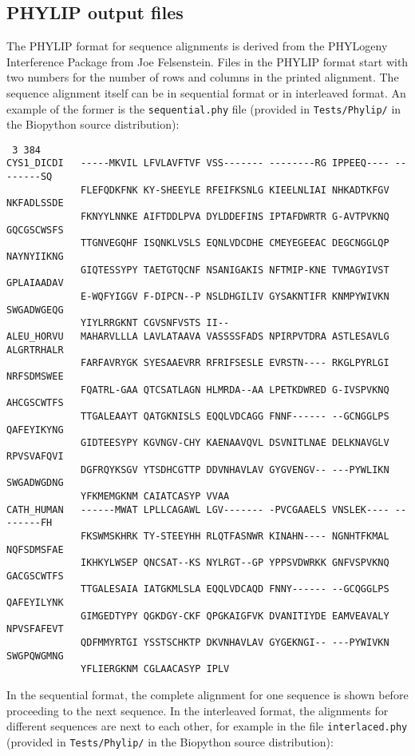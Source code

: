 \subsection{PHYLIP output files}
\label{subsec:align_phylip}

The PHYLIP format for sequence alignments is derived from the PHYLogeny Interference Package from Joe Felsenstein. Files in the PHYLIP format start with two numbers for the number of rows and columns in the printed alignment. The sequence alignment itself can be in sequential format or in interleaved format. An example of the former is the \verb|sequential.phy| file (provided in \verb+Tests/Phylip/+ in the Biopython source distribution):
\begin{verbatim}
 3 384
CYS1_DICDI   -----MKVIL LFVLAVFTVF VSS------- --------RG IPPEEQ---- --------SQ 
             FLEFQDKFNK KY-SHEEYLE RFEIFKSNLG KIEELNLIAI NHKADTKFGV NKFADLSSDE 
             FKNYYLNNKE AIFTDDLPVA DYLDDEFINS IPTAFDWRTR G-AVTPVKNQ GQCGSCWSFS 
             TTGNVEGQHF ISQNKLVSLS EQNLVDCDHE CMEYEGEEAC DEGCNGGLQP NAYNYIIKNG 
             GIQTESSYPY TAETGTQCNF NSANIGAKIS NFTMIP-KNE TVMAGYIVST GPLAIAADAV 
             E-WQFYIGGV F-DIPCN--P NSLDHGILIV GYSAKNTIFR KNMPYWIVKN SWGADWGEQG 
             YIYLRRGKNT CGVSNFVSTS II-- 
ALEU_HORVU   MAHARVLLLA LAVLATAAVA VASSSSFADS NPIRPVTDRA ASTLESAVLG ALGRTRHALR 
             FARFAVRYGK SYESAAEVRR RFRIFSESLE EVRSTN---- RKGLPYRLGI NRFSDMSWEE 
             FQATRL-GAA QTCSATLAGN HLMRDA--AA LPETKDWRED G-IVSPVKNQ AHCGSCWTFS 
             TTGALEAAYT QATGKNISLS EQQLVDCAGG FNNF------ --GCNGGLPS QAFEYIKYNG 
             GIDTEESYPY KGVNGV-CHY KAENAAVQVL DSVNITLNAE DELKNAVGLV RPVSVAFQVI 
             DGFRQYKSGV YTSDHCGTTP DDVNHAVLAV GYGVENGV-- ---PYWLIKN SWGADWGDNG 
             YFKMEMGKNM CAIATCASYP VVAA 
CATH_HUMAN   ------MWAT LPLLCAGAWL LGV------- -PVCGAAELS VNSLEK---- --------FH 
             FKSWMSKHRK TY-STEEYHH RLQTFASNWR KINAHN---- NGNHTFKMAL NQFSDMSFAE 
             IKHKYLWSEP QNCSAT--KS NYLRGT--GP YPPSVDWRKK GNFVSPVKNQ GACGSCWTFS 
             TTGALESAIA IATGKMLSLA EQQLVDCAQD FNNY------ --GCQGGLPS QAFEYILYNK 
             GIMGEDTYPY QGKDGY-CKF QPGKAIGFVK DVANITIYDE EAMVEAVALY NPVSFAFEVT 
             QDFMMYRTGI YSSTSCHKTP DKVNHAVLAV GYGEKNGI-- ---PYWIVKN SWGPQWGMNG 
             YFLIERGKNM CGLAACASYP IPLV
\end{verbatim}
In the sequential format, the complete alignment for one sequence is shown before proceeding to the next sequence. In the interleaved format, the alignments for different sequences are next to each other, for example in the file \verb|interlaced.phy| (provided in \verb+Tests/Phylip/+ in the Biopython source distribution):
